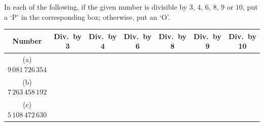  In each of the following, if the given number is divisible by $3$, $4$, $6$, $8$, $9$ or $10$, put a `P' in the corresponding box; otherwise, put an `O'.
\par\finishquestion

\begin{center}
\small
\begin{tabular}{|c|c|c|c|c|c|c|}
\hline
\textbf{Number} & \textbf{Div.\ by 3} & \textbf{Div.\ by 4} & \textbf{Div.\ by 6} & \textbf{Div.\ by 8} & \textbf{Div.\ by 9} & \textbf{Div.\ by 10}\\
\hline
(a) $9\,081\,726\,354$ & & & & & & \\ \hline
(b) $7\,263\,458\,192$ & & & & & & \\ \hline
(c) $5\,108\,472\,630$ & & & & & & \\ \hline
\end{tabular}
\end{center}
